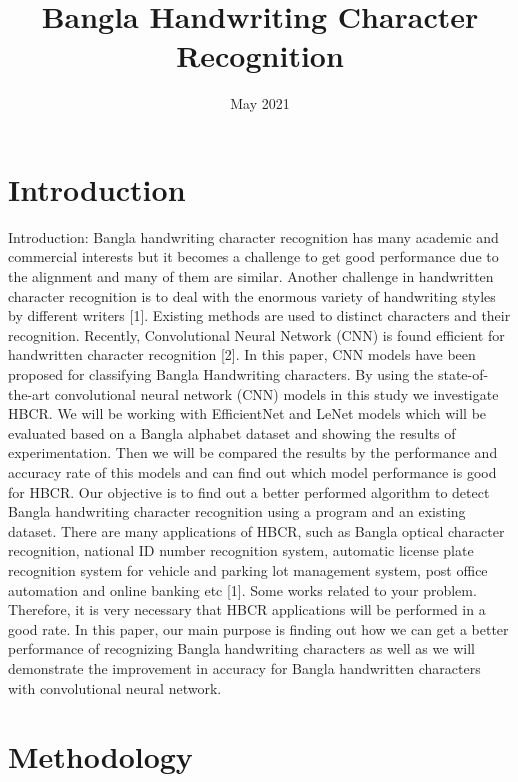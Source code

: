 \documentclass{article}
\title{Bangla Handwriting Character Recognition}
\date{May 2021}
\begin{document}
\maketitle

\section{Introduction}
Introduction:
Bangla handwriting character recognition has many academic and commercial interests but it becomes a challenge to get good performance due to the alignment and many of them are similar. Another challenge in handwritten character recognition is to deal with the enormous variety of handwriting styles by different writers [1]. Existing methods are used to distinct characters and their recognition. Recently, Convolutional Neural Network (CNN) is found efficient for handwritten character recognition [2]. 
In this paper, CNN models have been proposed for classifying Bangla Handwriting characters. By using the state-of-the-art convolutional neural network (CNN) models in this study we investigate HBCR. We will be working with EfficientNet and LeNet models which will be evaluated based on a Bangla alphabet dataset and showing the results of experimentation. Then we will be compared the results by the performance and accuracy rate of this models and can find out which model performance is good for HBCR. Our objective is to find out a better performed algorithm to detect Bangla handwriting character recognition using a program and an existing dataset.
There are many applications of HBCR, such as Bangla optical character recognition, national ID number recognition system, automatic license plate recognition system for vehicle and parking lot management system, post office automation and online banking etc [1]. Some works related to your problem. Therefore, it is very necessary that HBCR applications will be performed in a good rate. In this paper, our main purpose is finding out how we can get a better performance of recognizing Bangla handwriting characters as well as we will demonstrate the improvement in accuracy for Bangla handwritten characters with convolutional neural network.
	

\section{Methodology}
\end{document}
